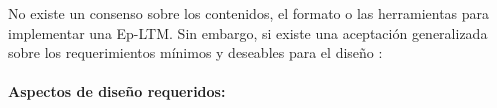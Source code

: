 No existe un consenso sobre los contenidos, el formato o las herramientas para implementar una Ep-LTM.
Sin embargo, si existe una aceptación generalizada sobre los requerimientos mínimos y deseables para el diseño \cite{Vijayakumar2014, Ho2009,  Stachowicz2012, Jockel2008}:


\paragraph{Aspectos de diseño requeridos:}



